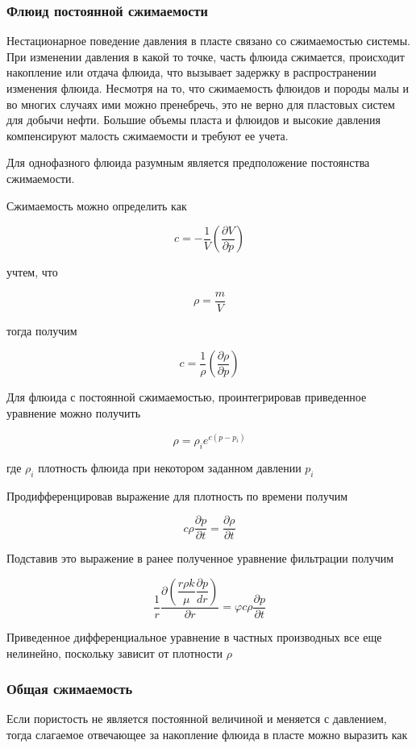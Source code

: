 \subsubsection{Флюид постоянной сжимаемости}
 
Нестационарное поведение давления в пласте связано со сжимаемостью системы. При изменении давления в какой то точке, часть флюида сжимается, происходит накопление или отдача флюида, что вызывает задержку в распространении изменения флюида. Несмотря на то, что сжимаемость флюидов и породы малы и во многих случаях ими можно пренебречь, это не верно для пластовых систем для добычи нефти. Большие объемы пласта и флюидов и высокие давления компенсируют малость сжимаемости и требуют ее учета. 

Для однофазного флюида разумным является предположение постоянства сжимаемости.

Сжимаемость можно определить как 

$$c=-\frac{1}{V} \left(  \frac{ \partial V}{ \partial p}  \right) $$ 

учтем, что

$$ \rho = \frac{m}{V} $$  

тогда получим

$$c=\frac{1}{\rho} \left(  \frac{ \partial \rho}{ \partial p}  \right) $$ 

Для флюида с постоянной сжимаемостью, проинтегрировав приведенное уравнение можно получить 

$$\rho = \rho_i e^{c(p-p_i)}$$

где $\rho_i$ плотность флюида при некотором заданном давлении $p_i$

Продифференцировав выражение для плотность по времени получим 

$$
c \rho \frac{\partial p}{\partial t} = \frac{\partial \rho}{\partial t}
$$

Подставив это выражение в ранее полученное уравнение фильтрации получим 

$$ 
\frac{1}{r}\frac{\partial\left( \dfrac{r\rho k}{\mu}\dfrac{\partial p}{dr}\right)}{\partial r}=\varphi c \rho \frac{\partial p}{\partial t}  
$$

Приведенное дифференциальное уравнение в частных производных все еще нелинейно, поскольку зависит от плотности $\rho$ 



\subsubsection{Общая сжимаемость}
Если пористость не является постоянной величиной и меняется с давлением, тогда  слагаемое отвечающее за накопление флюида в пласте можно выразить как 


